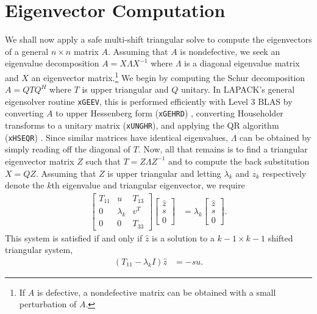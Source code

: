 \documentclass{article}
\begin{document}
\section{Eigenvector Computation} \label{section:eigenvector}
We shall now apply a safe multi-shift triangular solve to compute the
eigenvectors of a general \(n\times n\) matrix \(A\).  Assuming that
\(A\) is nondefective, we seek an eigenvalue decomposition
\(A=X\Lambda X^{-1}\) where \(\Lambda\) is a diagonal eigenvalue
matrix and \(X\) an eigenvector matrix.\footnote{ If \(A\) is
  defective, a nondefective matrix can be obtained with a small
  perturbation of \(A\).}  We begin by computing the Schur
decomposition \(A=Q TQ^H\) where \(T\) is upper triangular and \(Q\)
unitary. In LAPACK's general eigensolver routine \texttt{xGEEV}, this
is performed efficiently with Level 3 BLAS by converting \(A\) to
upper Hessenberg form (\texttt{xGEHRD}) \cite{quintana2006improving},
converting Householder transforms to a unitary matrix
(\texttt{xUNGHR}), and applying the QR algorithm (\texttt{xHSEQR})
\cite{braman2002multishift1, braman2002multishift2}. Since similar
matrices have identical eigenvalues, \(\Lambda\) can be obtained by
simply reading off the diagonal of \(T\).  Now, all that remains is to
find a triangular eigenvector matrix \(Z\) such that \(T=Z \Lambda
Z^{-1}\) and to compute the back substitution \(X=QZ\).  Assuming that
\(Z\) is upper triangular and letting \(\lambda_k\) and \(z_k\)
respectively denote the \(k\)th eigenvalue and triangular eigenvector,
we require
\begin{align}
  \left[
  \begin{matrix}
    T_{11} & u & T_{13} \\
    0 & \lambda_k & v^T \\
    0 & 0 & T_{33}
  \end{matrix}
  \right]
  \left[
  \begin{matrix}
    \hat{z} \\ s \\ 0
  \end{matrix}
  \right]
  &=
  \lambda_k
  \left[
  \begin{matrix}
    \hat{z} \\ s \\ 0
  \end{matrix}
  \right].
\end{align}
This system is satisfied if and only if \(\hat{z}\) is a solution to a
\(k-1\times k-1\) shifted triangular system,
\begin{align}
  \left(T_{11} - \lambda_k I\right) \hat{z} &= -s u.
  \label{eq:triangeig-2}
\end{align}
\end{document}

